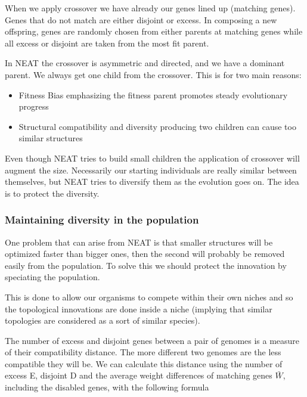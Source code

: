 When we apply crossover we have already our genes lined up (matching genes). Genes that do not match are either disjoint or excess. In composing a new offspring, genes are randomly chosen from either parents at matching genes while all excess or disjoint are taken from the most fit parent. 

\vspace{10pt}

In NEAT the crossover is asymmetric and directed, and we have a dominant parent. We always get one child from the crossover. This is for two main reasons:

\begin{itemize}
    \item Fitness Bias \ra emphasizing the fitness parent promotes steady evolutionary progress
    \item Structural compatibility and diversity \ra producing two children can cause too similar structures 
\end{itemize}

Even though NEAT tries to build small children the application of crossover will augment the size. Necessarily our starting individuals are really similar between themselves, but NEAT tries to diversify them as the evolution goes on. The idea is to protect the diversity. 

\subsubsection{Maintaining diversity in the population}

One problem that can arise from NEAT is that smaller structures will be optimized faster than bigger ones, then the second will probably be removed easily from the population. To solve this we should protect the innovation by speciating the population. 

\vspace{10pt}

This is done to allow our organisms to compete within their own niches and so the topological innovations are done inside a niche (implying that similar topologies are considered as a sort of similar species). 

\vspace{10pt}

The number of excess and disjoint genes between a pair of genomes is a measure of their compatibility distance. The more different two genomes are the less compatible they will be. We can calculate this distance using the number of excess E, disjoint D and the average weight differences of matching genes $\bar{W}$, including the disabled genes, with the following formula

